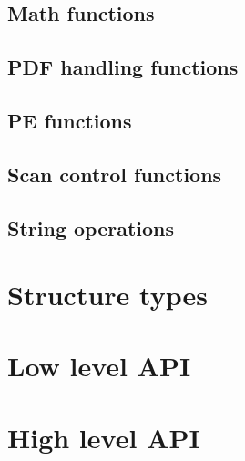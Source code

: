 \subsection{Math functions}
\label{math}
\hypertarget{math}{}

\subsection{PDF handling functions}
\label{pdfg}
\hypertarget{pdfg}{}

\subsection{PE functions}
\label{pe}
\hypertarget{pe}{}

\subsection{Scan control functions}
\label{scanc}
\hypertarget{scanc}{}

\subsection{String operations}
\label{stringops}
\hypertarget{stringops}{}

\section{Structure types}












\section{Low level API}




\section{High level API}

\setlength{\parindent}{18pt}
